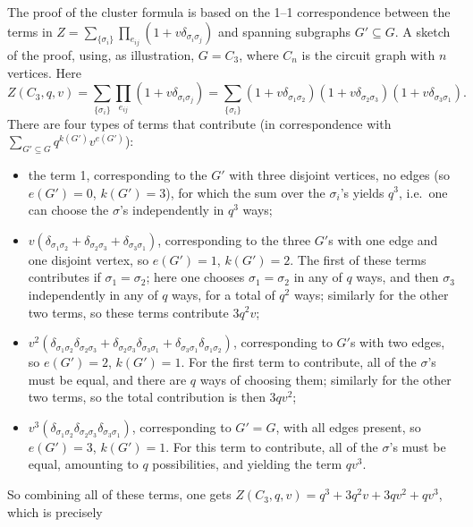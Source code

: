 The proof of the cluster formula is based on the 1--1 correspondence between the terms in
$Z = \sum_{\{\sigma_i\}}\prod_{e_{ij}}\left(1+v\delta_{\sigma_i\sigma_j}\right)$ and spanning subgraphs $G'\subseteq G$. A sketch of
the proof, using, as illustration, $G = C_3$, where $C_n$ is the circuit graph with $n$ vertices. Here
\begin{equation}
  Z(C_3,q,v) = \sum_{\{\sigma_i\}}\prod_{e_{ij}}\left(1+v\delta_{\sigma_i\sigma_j}\right)
  = \sum_{\{\sigma_i\}}\left(1+v\delta_{\sigma_1\sigma_2}\right)\left(1+v\delta_{\sigma_2\sigma_3}\right)\left(1+v\delta_{\sigma_3\sigma_1}\right).
\end{equation}
There are four types of terms that contribute (in correspondence with $\sum_{G'\subseteq G}q^{k(G')}v^{e(G')}$):
\begin{itemize}
  \item the term 1, corresponding to the $G'$ with three disjoint vertices, no edges (so $e(G') = 0$, $k(G') = 3$), for which
    the sum over the $\sigma_i$'s yields $q^3$, i.e.\ one can choose the $\sigma$'s independently in $q^3$ ways;
  \item $v\left(\delta_{\sigma_1\sigma_2}+\delta_{\sigma_2\sigma_3}+\delta_{\sigma_3\sigma_1}\right)$, corresponding to the three
    $G'$s with one edge and one disjoint vertex, so $e(G') = 1$, $k(G') = 2$. The first of these terms contributes if
    $\sigma_1 = \sigma_2$; here one chooses $\sigma_1 = \sigma_2$ in any of $q$ ways, and then $\sigma_3$ independently in any
    of $q$ ways, for a total of $q^2$ ways; similarly for the other two terms, so these terms contribute $3q^2v$;
  \item $v^2\left(\delta_{\sigma_1\sigma_2}\delta_{\sigma_2\sigma_3}+\delta_{\sigma_2\sigma_3}\delta_{\sigma_3\sigma_1}
    +\delta_{\sigma_3\sigma_1}\delta_{\sigma_1\sigma_2}\right)$, corresponding to $G'$s with two edges, so $e(G') = 2$,
    $k(G') = 1$. For the first term to contribute, all of the $\sigma$'s must be equal, and there are $q$ ways of choosing
    them; similarly for the other two terms, so the total contribution is then $3qv^2$;
  \item $v^3\left(\delta_{\sigma_1\sigma_2}\delta_{\sigma_2\sigma_3}\delta_{\sigma_3\sigma_1}\right)$, corresponding to $G' = G$,
    with all edges present, so $e(G') = 3$, $k(G') = 1$. For this term to contribute, all of the $\sigma$'s must be equal,
    amounting to $q$ possibilities, and yielding the term $qv^3$.
\end{itemize}
So combining all of these terms, one gets $Z(C_3,q,v) = q^3+3q^2v+3qv^2+qv^3$, which is precisely
